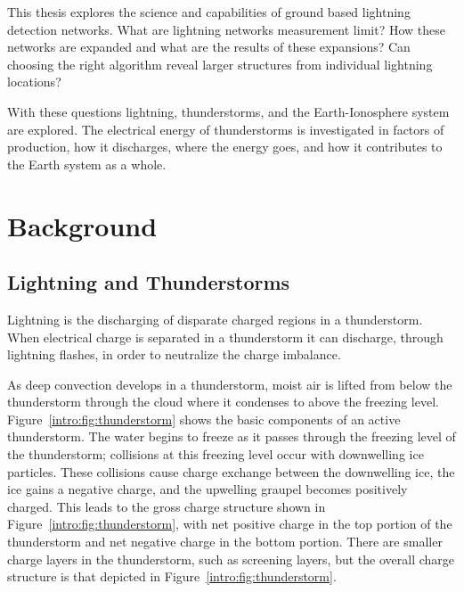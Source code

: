 This thesis explores the science and capabilities of ground based lightning detection networks.
What are lightning networks measurement limit?
How these networks are expanded and what are the results of these expansions?
Can choosing the right algorithm reveal larger structures from individual lightning locations?

With these questions lightning, thunderstorms, and the Earth-Ionosphere system are explored.
The electrical energy of thunderstorms is investigated in factors of production, how it discharges, where the energy goes, and how it contributes to the Earth system as a whole.


\section{Background}

\subsection{Lightning and Thunderstorms}

Lightning is the discharging of disparate charged regions in a thunderstorm.
When electrical charge is separated in a thunderstorm it can discharge, through lightning flashes, in order to neutralize the charge imbalance.

As deep convection develops in a thunderstorm, moist air is lifted from below the thunderstorm through the cloud where it condenses to above the freezing level.
Figure~\ref{intro:fig:thunderstorm} shows the basic components of an active thunderstorm.
The water begins to freeze as it passes through the freezing level of the thunderstorm; collisions at this freezing level occur with downwelling ice particles.
These collisions cause charge exchange between the downwelling ice, the ice gains a negative charge, and the upwelling graupel becomes positively charged.
This leads to the gross charge structure shown in Figure~\ref{intro:fig:thunderstorm}, with net positive charge in the top portion of the thunderstorm and net negative charge in the bottom portion.
There are smaller charge layers in the thunderstorm, such as screening layers, but the overall charge structure is that depicted in Figure~\ref{intro:fig:thunderstorm}.

